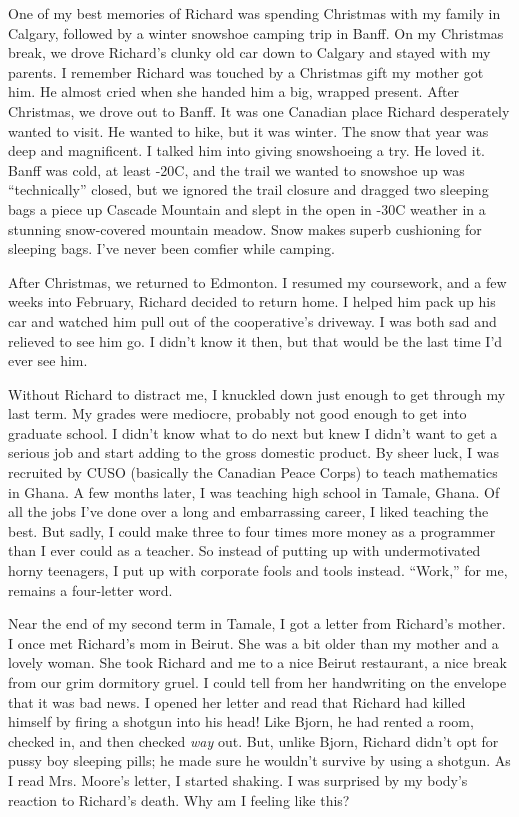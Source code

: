 One of my best memories of Richard was spending Christmas with my family
in Calgary, followed by a winter snowshoe camping trip in Banff. On my
Christmas break, we drove Richard's clunky old car down to Calgary and
stayed with my parents. I remember Richard was touched by a Christmas
gift my mother got him. He almost cried when she handed him a big,
wrapped present. After Christmas, we drove out to Banff. It was one
Canadian place Richard desperately wanted to visit. He wanted to hike,
but it was winter. The snow that year was deep and magnificent. I talked
him into giving snowshoeing a try. He loved it. Banff was cold, at least
-20C, and the trail we wanted to snowshoe up was ``technically'' closed,
but we ignored the trail closure and dragged two sleeping bags a piece
up Cascade Mountain and slept in the open in -30C weather in a stunning
snow-covered mountain meadow. Snow makes superb cushioning for sleeping
bags. I've never been comfier while camping.

After Christmas, we returned to Edmonton. I resumed my coursework, and a
few weeks into February, Richard decided to return home. I helped him
pack up his car and watched him pull out of the cooperative's driveway.
I was both sad and relieved to see him go. I didn't know it then, but
that would be the last time I'd ever see him.

Without Richard to distract me, I knuckled down just enough to get
through my last term. My grades were mediocre, probably not good enough
to get into graduate school. I didn't know what to do next but knew I
didn't want to get a serious job and start adding to the gross domestic
product. By sheer luck, I was recruited by CUSO (basically the Canadian
Peace Corps) to teach mathematics in Ghana. A few months later, I was
teaching high school in Tamale, Ghana. Of all the jobs I've done over a
long and embarrassing career, I liked teaching the best. But sadly, I
could make three to four times more money as a programmer than I ever
could as a teacher. So instead of putting up with undermotivated horny
teenagers, I put up with corporate fools and tools instead. ``Work,''
for me, remains a four-letter word.

Near the end of my second term in Tamale, I got a letter from Richard's
mother. I once met Richard's mom in Beirut. She was a bit older than my
mother and a lovely woman. She took Richard and me to a nice Beirut
restaurant, a nice break from our grim dormitory gruel. I could tell
from her handwriting on the envelope that it was bad news. I opened her
letter and read that Richard had killed himself by firing a shotgun into
his head! Like Bjorn, he had rented a room, checked in, and then checked
\emph{way} out. But, unlike Bjorn, Richard didn't opt for pussy boy
sleeping pills; he made sure he wouldn't survive by using a shotgun. As
I read Mrs. Moore's letter, I started shaking. I was surprised by my
body's reaction to Richard's death. Why am I feeling like this?

